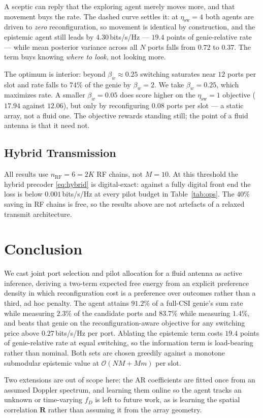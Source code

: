\documentclass[journal]{IEEEtran}
\newcommand{\bR}{\mathbf{R}}
\begin{document}
A sceptic can reply that the exploring agent merely moves more, and that
movement buys the rate. The dashed curve settles it: at $\eta_{\mathrm{sw}}=4$
both agents are driven to \emph{zero} reconfiguration, so movement is identical
by construction, and the epistemic agent still leads by $4.30$\,bits/s/Hz ---
$19.4$ points of genie-relative rate --- while mean posterior variance across
all $N$ ports falls from $0.72$ to $0.37$. The term buys knowing \emph{where to
look}, not looking more.

The optimum is interior: beyond $\beta_w\approx0.25$ switching saturates near
$12$ ports per slot and rate falls to $74\%$ of the genie by $\beta_w=2$. We
take $\beta_w=0.25$, which maximizes rate. A smaller $\beta_w=0.05$ does score
higher on the $\eta_{\mathrm{sw}}=1$ objective ($17.94$ against $12.06$), but
only by reconfiguring $0.08$ ports per slot --- a static array, not a fluid
one. The objective rewards standing still; the point of a fluid antenna is that
it need not.

\subsection{Hybrid Transmission}
All results use $n_{\mathrm{RF}}=6=2K$ RF chains, not $M=10$. At this
threshold the hybrid precoder \eqref{eq:hybrid} is digital-exact: against a
fully digital front end the loss is below $0.001$\,bits/s/Hz at every pilot
budget in Table~\ref{tab:ops}. The $40\%$ saving in RF chains is free, so the
results above are not artefacts of a relaxed transmit architecture.

\section{Conclusion}
\label{sec:conc}
We cast joint port selection and pilot allocation for a fluid antenna as active
inference, deriving a two-term expected free energy from an explicit preference
density in which reconfiguration cost is a preference over outcomes rather than
a third, ad hoc penalty. The agent attains $91.2\%$ of a full-CSI genie's sum
rate while measuring $2.3\%$ of the candidate ports and $83.7\%$ while
measuring $1.4\%$, and beats that genie on the reconfiguration-aware objective
for any switching price above $0.27$\,bits/s/Hz per port. Ablating the
epistemic term costs $19.4$ points of genie-relative rate at equal switching,
so the information term is load-bearing rather than nominal. Both sets are
chosen greedily against a monotone submodular epistemic value at
$\mathcal{O}(NM+Mm)$ per slot.

Two extensions are out of scope here: the AR coefficients are fitted once from
an assumed Doppler spectrum, and learning them online so the agent tracks an
unknown or time-varying $f_D$ is left to future work, as is learning the
spatial correlation $\bR$ rather than assuming it from the array geometry.



\end{document}
